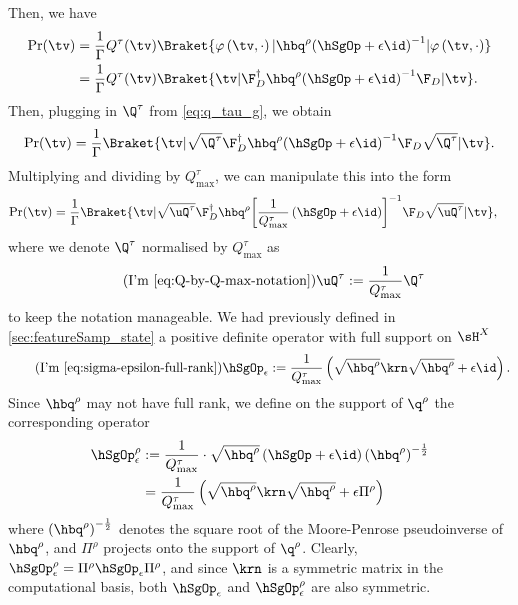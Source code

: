   Then, we have
  \begin{align}
    \label{eq:state_2}
    \Pr(\tv)
    &=\frac{1}{\Gamma}Q^{\tau}(\tv)\Braket{\varphi\left(\tv,\cdot\right) | \hbq^{\rho}{\left({\hSgOp}+\epsilon\id\right)}^{-1} | \varphi\left(\tv,\cdot\right)} \nonumber\\
    &=\frac{1}{\Gamma}Q^{\tau}(\tv)\Braket{\tv|\F_{D}^\dag \hbq^{\rho}{\left({\hSgOp}+\epsilon\id\right)}^{-1} \F_{D} | \tv}.
  \end{align}
  Then, plugging in $\Q^{\tau}$ from \cref{eq:q_tau_g}, we obtain
  \begin{equation}
    \Pr(\tv)
      =\frac{1}{\Gamma}\Braket{\tv|\sqrt{\Q^{\tau}}\F_{D}^\dag \hbq^{\rho}{\left({\hSgOp}+\epsilon\id\right)}^{-1} \F_{D} \sqrt{\Q^{\tau}}| \tv}.
  \end{equation}
  Multiplying and dividing by $Q_{\max}^{\tau}$, we can manipulate this into the form
  \begin{align}
    \label{eq:hat_p_lambda}
    \Pr(\tv)
    &=\frac{1}{\Gamma}{\Braket{\tv|\sqrt{\uQ^{\tau}}\F_{D}^\dag \hbq^{\rho}{\left[\frac{1}{Q_{\max}^{\tau}}\left(\hSgOp+\epsilon\id\right)\right]}^{-1} \F_{D} \sqrt{\uQ^{\tau}}| \tv}},
  \end{align} %
where we denote $\Q^{\tau}$ normalised by $Q_{\max}^{\tau}$ as
\begin{equation*}
  \tag{I'm \ref{eq:Q-by-Q-max-notation}}
  \uQ^{\tau} := \frac{1}{Q_{\max}^{\tau}}\Q^{\tau}
\end{equation*}
to keep the notation manageable. We had previously defined in \cref{sec:featureSamp_state} a positive definite operator with full support on $\sH^X$
\begin{equation*}
  \tag{I'm \ref{eq:sigma-epsilon-full-rank}}
  \hSgOp_\epsilon:=\frac{1}{Q_{\max}^{\tau}}\left(\sqrt{\hbq^{\rho}}\krn\sqrt{\hbq^{\rho}}+\epsilon\id\right).
\end{equation*} Since $\hbq^{\rho}$ may not have full rank, we define on the support of $\q^{\rho}$ the corresponding operator 
\begin{align*}
  \hSgOp_\epsilon^{\rho}&:= \frac{1}{Q_{\max}^{\tau}} \cdot \sqrt{\hbq^{\rho}}\left(\hSgOp+\epsilon\id\right){\left(\hbq^{\rho}\right)}^{-\frac{1}{2}}\nonumber\\
                                    &=\frac{1}{Q_{\max}^{\tau}}\left(\sqrt{\hbq^{\rho}}\krn\sqrt{\hbq^{\rho}}+\epsilon\Pi^{\rho}\right) %
\end{align*}
where ${\left(\hbq^{\rho}\right)}^{-\frac{1}{2}}$ denotes the square root of the Moore-Penrose pseudoinverse of $\hbq^{\rho}$, and $\Pi^{\rho}$ projects onto the support of $\q^{\rho}$. Clearly, $\hSgOp_\epsilon^{\rho}=\Pi^{\rho}\hSgOp_\epsilon\Pi^{\rho}$, and since $\krn$ is a symmetric matrix in the computational basis, both $\hSgOp_\epsilon$ and $\hSgOp_\epsilon^{\rho}$ are also symmetric.

